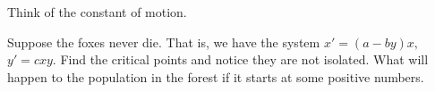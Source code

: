 \documentclass{ximera}
\begin{document}

\begin{exercise}%
    \begin{hint}
        Think of the constant of motion.
    \end{hint}
    Suppose the foxes never die.  That is, we have the system $x' = (a-by)x,$ $y' = cxy$. Find the critical points and notice they are not isolated. What will happen to the population in the forest if it starts at some positive numbers.  
\end{exercise}
\end{document}
